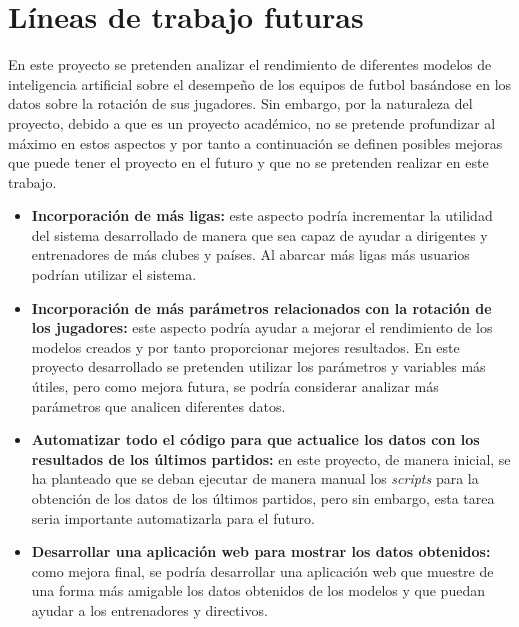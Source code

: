 \section{Líneas de trabajo futuras}


En este proyecto se pretenden analizar el rendimiento de diferentes modelos de inteligencia artificial sobre el desempeño de los equipos de futbol basándose en los datos sobre la rotación de sus jugadores. Sin embargo, por la naturaleza del proyecto, debido a que es un proyecto académico, no se pretende profundizar al máximo en estos aspectos y por tanto a continuación se definen posibles mejoras que puede tener el proyecto en el futuro y que no se pretenden realizar en este trabajo.
\begin{itemize}
    \item \textbf{Incorporación de más ligas: } este aspecto podría incrementar la utilidad del sistema desarrollado de manera que sea capaz de ayudar a dirigentes y entrenadores de más clubes y países. Al abarcar más ligas más usuarios podrían utilizar el sistema.
    \item \textbf{Incorporación de más parámetros relacionados con la rotación de los jugadores:} este aspecto podría ayudar a mejorar el rendimiento de los modelos creados y por tanto proporcionar mejores resultados. En este proyecto desarrollado se pretenden utilizar los parámetros y variables más útiles, pero como mejora futura, se podría considerar analizar más parámetros que analicen diferentes datos.
    \item \textbf{Automatizar todo el código para que actualice los datos con los resultados de los últimos partidos:} en este proyecto, de manera inicial, se ha planteado que se deban ejecutar de manera manual los \textit{scripts} para la obtención de los datos de los últimos partidos, pero sin embargo, esta tarea seria importante automatizarla para el futuro.
    \item \textbf{Desarrollar una aplicación web para mostrar los datos obtenidos:} como mejora final, se podría desarrollar una aplicación web que muestre de una forma más amigable los datos obtenidos de los modelos y que puedan ayudar a los entrenadores y directivos. 
\end{itemize}




